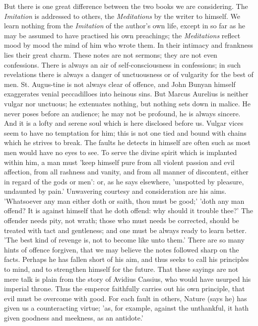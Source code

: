 But there is one great difference between the two books we are considering. The
\emph{Imitation} is addressed to others, the \emph{Meditations} by the writer
to himself. We learn nothing from the \emph{Imitation} of the author's own
life, except in so far as he may be assumed to have practised his own
preachings; the \emph{Meditations} reflect mood by mood the mind of him who
wrote them. In their intimacy and frankness lies their great charm. These notes
are not sermons; they are not even confessions. There is always an air of
self-consciousness in confessions; in such revelations there is always a danger
of unctuousness or of vulgarity for the best of men. St. Augus-tine is not
always clear of offence, and John Bunyan himself exaggerates venial
peccadilloes into heinous sins. But Marcus Aurelius is neither vulgar nor
unctuous; he extenuates nothing, but nothing sets down in malice. He never
poses before an audience; he may not be profound, he is always sincere. And it
is a lofty and serene soul which is here disclosed before us. Vulgar vices seem
to have no temptation for him; this is not one tied and bound with chains which
he strives to break. The faults he detects in himself are often such as most
men would have no eyes to see. To serve the divine spirit which is implanted
within him, a man must 'keep himself pure from all violent passion and evil
affection, from all rashness and vanity, and from all manner of discontent,
either in regard of the gods or men': or, as he says elsewhere, 'unspotted by
pleasure, undaunted by pain.' Unwavering courtesy and consideration are his
aims. 'Whatsoever any man either doth or saith, thou must be good;' 'doth any
man offend? It is against himself that he doth offend: why should it trouble
thee?' The offender needs pity, not wrath; those who must needs be corrected,
should be treated with tact and gentleness; and one must be always ready to
learn better. 'The best kind of revenge is, not to become like unto them.'
There are so many hints of offence forgiven, that we may believe the notes
followed sharp on the facts. Perhaps he has fallen short of his aim, and thus
seeks to call his principles to mind, and to strengthen himself for the future.
That these sayings are not mere talk is plain from the story of Avidius
Cassius, who would have usurped his imperial throne. Thus the emperor
faithfully carries out his own principle, that evil must be overcome with good.
For each fault in others, Nature (says he) has given us a counteracting virtue;
'as, for example, against the unthankful, it hath given goodness and meekness,
as an antidote.'

